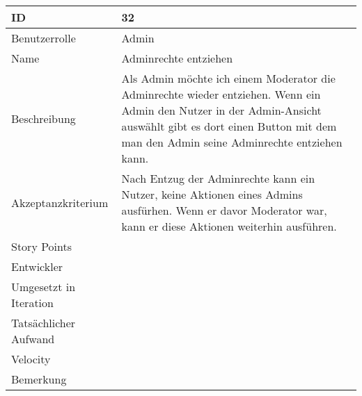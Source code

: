 \begin{tabularx}{\textwidth}{|p{}|X|}
	\hline
	ID & 32 \\
	\hline
	Benutzerrolle & Admin \\
	\hline
	Name & Adminrechte entziehen\\
	\hline
	Beschreibung & Als Admin möchte ich einem Moderator die Adminrechte wieder entziehen. Wenn ein Admin den Nutzer in der Admin-Ansicht auswählt gibt es dort einen Button mit dem man den Admin seine Adminrechte entziehen kann.  \\
	\hline
	Akzeptanzkriterium & Nach Entzug der Adminrechte kann ein Nutzer, keine Aktionen eines Admins ausfürhen. Wenn er davor Moderator war, kann er diese Aktionen weiterhin ausführen. \\
	\hline
	Story Points &  \\
	\hline
	Entwickler &  \\
	\hline
	Umgesetzt in Iteration & \\
	\hline
	Tatsächlicher Aufwand & \\
	\hline
	Velocity & \\
	\hline
	Bemerkung & \\
	\hline
\end{tabularx}
\vspace{20pt}
